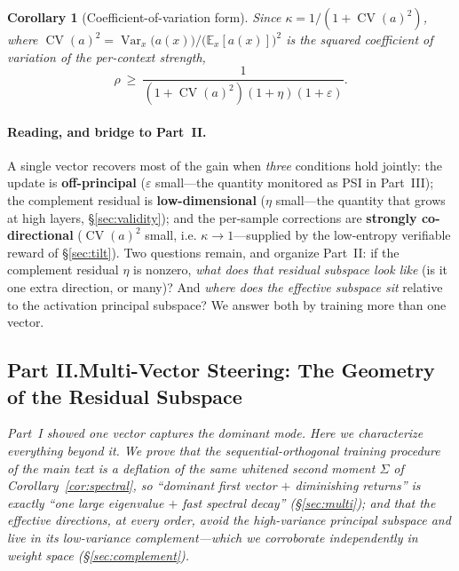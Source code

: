\documentclass[11pt]{article}
\newtheorem{corollary}{Corollary}[section]
\DeclareMathOperator{\CV}{CV}
\DeclareMathOperator{\Var}{Var}
\newcommand{\E}{\mathbb{E}}
\begin{document}
\begin{corollary}[Coefficient-of-variation form]\label{cor:cv}
Since $\kappa=1/(1+\CV(a)^2)$, where
$\CV(a)^2=\Var_x\big(a(x)\big)\big/\big(\E_x[a(x)]\big)^2$ is the squared coefficient of variation
of the per-context strength,
\begin{equation*}
\rho\ \ge\ \frac{1}{(1+\CV(a)^2)(1+\eta)(1+\varepsilon)} .
\end{equation*}
\end{corollary}

\paragraph{Reading, and bridge to Part~II.}
A single vector recovers most of the gain when \emph{three} conditions hold jointly: the update is
\textbf{off-principal} ($\varepsilon$ small---the quantity monitored as PSI in
Part~III); the complement residual is \textbf{low-dimensional} ($\eta$ small---the
quantity that grows at high layers, \S\ref{sec:validity}); and the per-sample corrections are
\textbf{strongly co-directional} ($\CV(a)^2$ small, i.e. $\kappa\to1$---supplied by the low-entropy
verifiable reward of \S\ref{sec:tilt}). Two questions remain, and organize Part~II:
if the complement residual $\eta$ is nonzero, \emph{what does that residual subspace look like}
(is it one extra direction, or many)? And \emph{where does the effective subspace sit} relative to
the activation principal subspace? We answer both by training more than one vector.

\subsection*{Part II.\quad Multi-Vector Steering: The Geometry of the Residual Subspace}
\noindent\emph{Part~I showed one vector captures the dominant mode. Here we
characterize everything beyond it. We prove that the sequential-orthogonal training procedure of the
main text is a deflation of the same whitened second moment $\Sigma$ of
Corollary~\ref{cor:spectral}, so ``dominant first vector $+$ diminishing returns'' is exactly
``one large eigenvalue $+$ fast spectral decay''
(\S\ref{sec:multi}); and that the effective directions, at every order, avoid the high-variance
principal subspace and live in its low-variance complement---which we corroborate independently in
weight space (\S\ref{sec:complement}).}
\end{document}
